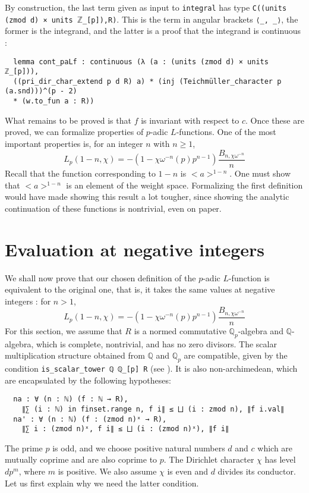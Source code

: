 \documentclass[11pt]{article}
\newcommand{\lean}[1]{\texttt{#1}\xspace} %
\begin{document}
By construction, the last term given as input to \lean{integral} has type \newline \lean{C((units (zmod d) × units $\mathbb{Z}$\_[p]),R)}. 
This is the term in angular brackets \lean{⟨\_, \_⟩}, the former is the integrand, and the latter is a proof that the integrand is continuous : 

\begin{lstlisting}
  lemma cont_paLf : continuous (λ (a : (units (zmod d) × units ℤ_[p])),
  ((pri_dir_char_extend p d R) a) * (inj (Teichmüller_character p (a.snd)))^(p - 2)
  * (w.to_fun a : R))
\end{lstlisting}

What remains to be proved is that $f$ is invariant with respect to $c$. 
Once these are proved, we can formalize properties of $p$-adic $L$-functions. One of the most
important properties is, for an integer $n$ with $n \ge 1$,
$$ L_p (1 - n, \chi) = -(1 - \chi \omega^{-n}(p)p^{n - 1}) \frac{B_{n, \chi \omega^{-n}}}{n} $$
Recall that the function corresponding to $1 - n$ is $<a>^{1 - n}$. One must show that $<a>^{1 - n}$ is 
an element of the weight space. Formalizing the first definition would have made showing this result a 
lot tougher, since showing the analytic continuation of these functions is nontrivial, even on paper.

\section{Evaluation at negative integers}
We shall now prove that our chosen definition of the $p$-adic $L$-function is equivalent to the original one, that is, 
it takes the same values at negative integers : for $n > 1$,
$$ L_p (1 - n, \chi) = -(1 - \chi \omega^{-n}(p)p^{n - 1}) \frac{B_{n, \chi \omega^{-n}}}{n} $$
For this section, we assume that $R$ is a normed commutative $\mathbb{Q}_p$-algebra and $\mathbb{Q}$-algebra, 
which is complete, nontrivial, and has no zero divisors. The scalar multiplication structure obtained from $\mathbb{Q}$ 
and $\mathbb{Q}_p$ are compatible, given by the condition \lean{is\_scalar\_tower ℚ ℚ\_[p] R} (see \cite{DD}). It is also non-archimedean, which are encapsulated by the following hypotheses:
\begin{lstlisting}
  na : ∀ (n : ℕ) (f : ℕ → R), 
    ∥∑ (i : ℕ) in finset.range n, f i∥ ≤ ⨆ (i : zmod n), ∥f i.val∥
  na' : ∀ (n : ℕ) (f : (zmod n)ˣ → R), 
    ∥∑ i : (zmod n)ˣ, f i∥ ≤ ⨆ (i : (zmod n)ˣ), ∥f i∥
\end{lstlisting}
The prime $p$ is odd, and we choose positive natural numbers $d$ and $c$ which are mutually coprime and are also coprime to 
$p$. The Dirichlet character $\chi$ has level $d p^m$, where $m$ is positive. We also assume $\chi$ is even and $d$ divides 
its conductor. Let us first explain why we need the latter condition.
\end{document}
